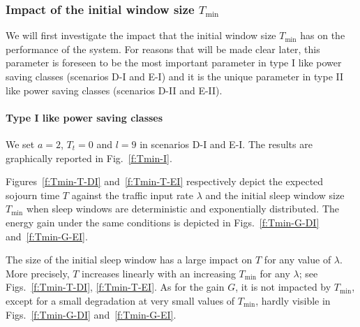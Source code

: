 \documentclass[journal]{IEEEtran}
\begin{document}
\subsubsection{Impact of the initial window size $T_{\min}$}
\label{s:Tmin}
We will first investigate the impact that the initial window size $T_{\min}$ has on the performance of the system. For reasons that will be made clear later, this parameter is foreseen to be the most important parameter in type I like power saving classes (scenarios D-I and E-I) and it is the unique parameter in type II like power saving classes (scenarios D-II and E-II).
\paragraph{Type I like power saving classes}
We set $a=2$, $T_t=0$ and $l=9$ in scenarios D-I and E-I. The results are
graphically reported in Fig.~\ref{f:Tmin-I}.
\begin{figure*}[tb]
\begin{center}
\caption{Impact of $T_{\min}$ on $T$ and $G$ in type I like power saving classes.
\label{f:Tmin-I}}
\end{center}
\end{figure*}
Figures~\ref{f:Tmin-T-DI} and~\ref{f:Tmin-T-EI} respectively depict the expected sojourn time $T$ against the traffic input rate $\lambda$ and the initial sleep window size $T_{\min}$ when sleep windows are deterministic and exponentially distributed. The energy gain under the same conditions is depicted in Figs.~\ref{f:Tmin-G-DI} and~\ref{f:Tmin-G-EI}.

The size of the initial sleep window has a large impact on $T$ for any value of $\lambda$. More precisely, $T$ increases linearly with an increasing $T_{\min}$ for any $\lambda$; see Figs.~\ref{f:Tmin-T-DI},
\ref{f:Tmin-T-EI}. As for the gain $G$, it is not impacted by $T_{\min}$, except for a small degradation at very small values of $T_{\min}$, hardly visible in Figs.~\ref{f:Tmin-G-DI} and~\ref{f:Tmin-G-EI}.
\end{document}

